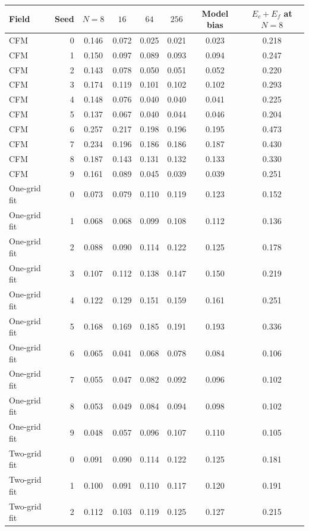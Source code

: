 \begin{tabular}{@{}lrcccccc@{}}
\toprule
Field & Seed & $N=8$ & $16$ & $64$ & $256$ & Model bias & $E_c+E_f$ at $N=8$\\
\midrule
CFM & 0 & 0.146 & 0.072 & 0.025 & 0.021 & 0.023 & 0.218\\
CFM & 1 & 0.150 & 0.097 & 0.089 & 0.093 & 0.094 & 0.247\\
CFM & 2 & 0.143 & 0.078 & 0.050 & 0.051 & 0.052 & 0.220\\
CFM & 3 & 0.174 & 0.119 & 0.101 & 0.102 & 0.102 & 0.293\\
CFM & 4 & 0.148 & 0.076 & 0.040 & 0.040 & 0.041 & 0.225\\
CFM & 5 & 0.137 & 0.067 & 0.040 & 0.044 & 0.046 & 0.204\\
CFM & 6 & 0.257 & 0.217 & 0.198 & 0.196 & 0.195 & 0.473\\
CFM & 7 & 0.234 & 0.196 & 0.186 & 0.186 & 0.187 & 0.430\\
CFM & 8 & 0.187 & 0.143 & 0.131 & 0.132 & 0.133 & 0.330\\
CFM & 9 & 0.161 & 0.089 & 0.045 & 0.039 & 0.039 & 0.251\\
\addlinespace
One-grid fit & 0 & 0.073 & 0.079 & 0.110 & 0.119 & 0.123 & 0.152\\
One-grid fit & 1 & 0.068 & 0.068 & 0.099 & 0.108 & 0.112 & 0.136\\
One-grid fit & 2 & 0.088 & 0.090 & 0.114 & 0.122 & 0.125 & 0.178\\
One-grid fit & 3 & 0.107 & 0.112 & 0.138 & 0.147 & 0.150 & 0.219\\
One-grid fit & 4 & 0.122 & 0.129 & 0.151 & 0.159 & 0.161 & 0.251\\
One-grid fit & 5 & 0.168 & 0.169 & 0.185 & 0.191 & 0.193 & 0.336\\
One-grid fit & 6 & 0.065 & 0.041 & 0.068 & 0.078 & 0.084 & 0.106\\
One-grid fit & 7 & 0.055 & 0.047 & 0.082 & 0.092 & 0.096 & 0.102\\
One-grid fit & 8 & 0.053 & 0.049 & 0.084 & 0.094 & 0.098 & 0.102\\
One-grid fit & 9 & 0.048 & 0.057 & 0.096 & 0.107 & 0.110 & 0.105\\
\addlinespace
Two-grid fit & 0 & 0.091 & 0.090 & 0.114 & 0.122 & 0.125 & 0.181\\
Two-grid fit & 1 & 0.100 & 0.091 & 0.110 & 0.117 & 0.120 & 0.191\\
Two-grid fit & 2 & 0.112 & 0.103 & 0.119 & 0.125 & 0.127 & 0.215\\

\end{tabular}
